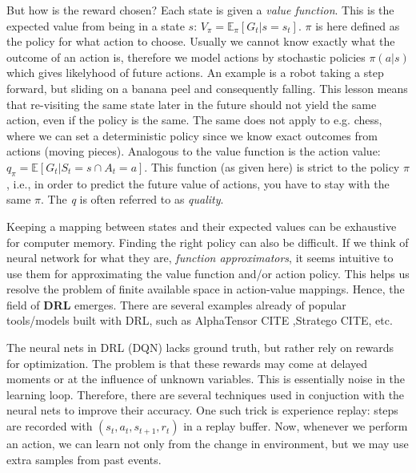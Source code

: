 \documentclass[10pt,twocolumn,letterpaper]{article}
\begin{document}
But how is the reward chosen? Each state is given a \textit{value function}. This is the expected value from being in a state $s$: $V_{\pi} = \mathbb{E}_{\pi} [ G_{t} | s = s_{t}]$. $\pi$ is here defined as the policy for what action to choose. Usually we cannot know exactly what the outcome of an action is, therefore we model actions by stochastic policies $\pi{}(a | s)$ which gives likelyhood of future actions. An example is a robot taking a step forward, but sliding on a banana peel and consequently falling. This lesson means that re-visiting the same state later in the future should not yield the same action, even if the policy is the same. The same does not apply to e.g. chess, where we can set a deterministic policy since we know exact outcomes from actions (moving pieces). 
Analogous to the value function is the action value: $q_{\pi{}} = \mathbb{E} [ G_{t} \vert{} S_{t} = s \cap A_{t} = a]$. This function (as given here) is strict to the policy $\pi$, i.e., in order to predict the future value of actions, you have to stay with the same $\pi$. The \textit{q} is often referred to as \textit{quality}. 



Keeping a mapping between states and their expected values can be exhaustive for computer memory. Finding the right policy can also be difficult. If we think of neural network for what they are, \textit{function approximators}, it seems intuitive to use them for approximating the value function and/or action policy. This helps us resolve the problem of finite available space in action-value mappings. Hence, the field of \textbf{\gls{DRL}} emerges. There are several examples already of popular tools/models built with \gls{DRL}, such as AlphaTensor CITE ,Stratego CITE, etc. 

The neural nets in \gls{DRL} (\gls{DQN}) lacks ground truth, but rather rely on rewards for optimization. The problem is that these rewards may come at delayed moments or at the influence of unknown variables. This is essentially noise in the learning loop. Therefore, there are several techniques used in conjuction with the neural nets to improve their accuracy. One such trick is experience replay: steps are recorded with $(s_{t}, a_{t}, s_{t+1}, r_{t})$ in a replay buffer. Now, whenever we perform an action, we can learn not only from the change in environment, but we may use extra samples from past events.
\end{document}
